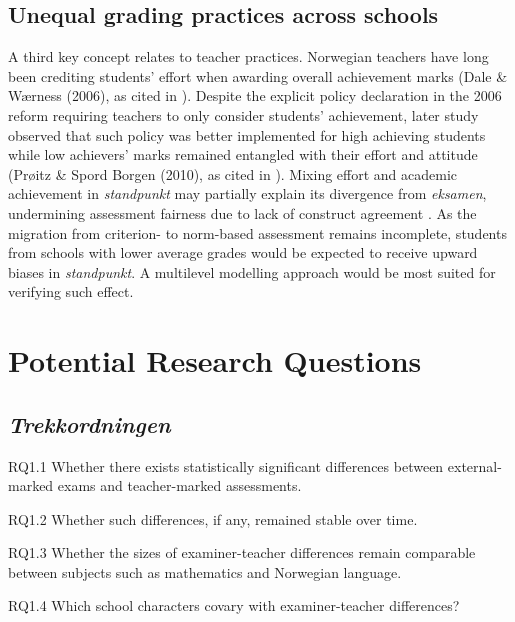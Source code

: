 \documentclass[
    a4paper,            %
    12pt,               %
    stu,                %
    donotrepeattitle,   %
    noextraspace,       %
    floatsintext,       %
    biblatex,           %
    colorlinks=true,        %
    linkcolor=red,          %
    anchorcolor=black,      %
    citecolor=blue,         %
    urlcolor=blue,          %
    bookmarks=true,         %
    bookmarksopen=false,    %
    bookmarksnumbered=true  %
]{apa7}
\begin{document}
\subsection{Unequal grading practices across schools}

A third key concept relates to teacher practices. Norwegian teachers have long been crediting students' effort when awarding overall achievement marks (Dale \& W{\ae}rness (2006), as cited in \textcite{tveit:2014}). Despite the explicit policy declaration in the 2006 reform requiring teachers to only consider students' achievement, later study observed that such policy was better implemented for high achieving students while low achievers' marks remained entangled with their effort and attitude (Pr{\o}itz \& Spord Borgen (2010), as cited in \textcite{tveit:2014}). Mixing effort and academic achievement in \textit{standpunkt} may partially explain its divergence from \textit{eksamen}, undermining assessment fairness due to lack of construct agreement \parencite{olson:2021}. As the migration from criterion- to norm-based assessment remains incomplete, students from schools with lower average grades would be expected to receive upward biases in \textit{standpunkt}. A multilevel modelling approach would be most suited for verifying such effect.

\section{Potential Research Questions}

\subsection{\textit{Trekkordningen}}
\begin{APAenumerate}
    \item[RQ1.1] Whether there exists statistically significant differences between external-marked exams and teacher-marked assessments.
    \item[RQ1.2] Whether such differences, if any, remained stable over time.
    \item[RQ1.3] Whether the sizes of examiner-teacher differences remain comparable between subjects such as mathematics and Norwegian language.
    \item[RQ1.4] Which school characters covary with examiner-teacher differences?
\end{APAenumerate}
\end{document}
